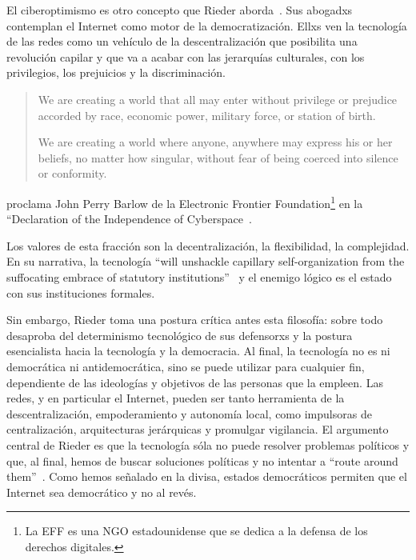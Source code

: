 El ciberoptimismo es otro concepto que Rieder aborda~\autocite{Rieder2012}.
Sus abogadxs contemplan el Internet como motor de la democratización.
Ellxs ven la tecnología de las redes como un vehículo de la descentralización que posibilita una revolución capilar y que va a acabar con las jerarquías culturales, con los privilegios, los prejuicios y la discriminación.

\begin{quotation}
We are creating a world that all may enter without privilege or prejudice accorded by race, economic power, military force, or station of birth.

We are creating a world where anyone, anywhere may express his or her beliefs, no matter how singular, without fear of being coerced into silence or conformity.
\end{quotation}
proclama John Perry Barlow de la Electronic Frontier Foundation\footnote{La EFF es una NGO estadounidense que se dedica a la defensa de los derechos digitales.} en la ``Declaration of the Independence of Cyberspace~\autocite{Barlow1996}.

Los valores de esta fracción  son la decentralización, la flexibilidad, la complejidad.
En su narrativa, la tecnología ``will unshackle capillary self-organization from the suffocating embrace of statutory institutions''~\autocite{Rieder2012} y el enemigo lógico es el estado con sus instituciones formales.

Sin embargo, Rieder toma una postura crítica antes esta filosofía: sobre todo desaproba del determinismo tecnológico de sus defensorxs y la postura esencialista hacia la tecnología y la democracia.
Al final, la tecnología no es ni democrática ni antidemocrática, sino se puede utilizar para cualquier fin, dependiente de las ideologías y objetivos de las personas que la empleen.
Las redes, y en particular el Internet, pueden ser tanto herramienta de la descentralización, empoderamiento y autonomía local, como impulsoras de centralización, arquitecturas jerárquicas y promulgar vigilancia.
El argumento central de Rieder es que la tecnología sóla no puede resolver problemas políticos y que, al final, hemos de buscar soluciones políticas y no intentar a ``route around them''~\autocite{Rieder2012}.
Como hemos señalado en la divisa, estados democráticos permiten que el Internet sea democrático y no al revés.


